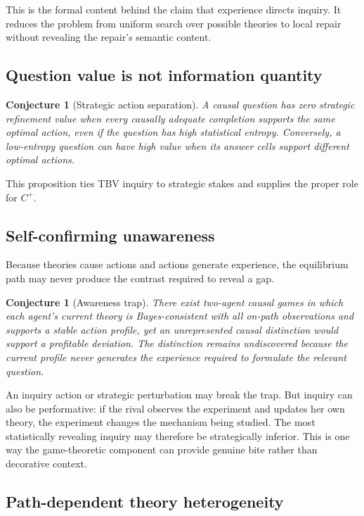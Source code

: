 \documentclass[11pt]{article}
\newtheorem{conjecture}[proposition]{Conjecture}
\newcommand{\cplus}{C^{+}}
\begin{document}
	This is the formal content behind the claim that experience directs inquiry.  It reduces the problem from uniform search over possible theories to local repair without revealing the repair's semantic content.
	
	\subsection{Question value is not information quantity}
	
	\begin{conjecture}[Strategic action separation]
		A causal question has zero strategic refinement value when every causally adequate completion supports the same optimal action, even if the question has high statistical entropy.  Conversely, a low-entropy question can have high value when its answer cells support different optimal actions.
	\end{conjecture}
	
	This proposition ties TBV inquiry to strategic stakes and supplies the proper role for $\cplus$.
	
	\subsection{Self-confirming unawareness}
	
	Because theories cause actions and actions generate experience, the equilibrium path may never produce the contrast required to reveal a gap.
	
	\begin{conjecture}[Awareness trap]
		There exist two-agent causal games in which each agent's current theory is Bayes-consistent with all on-path observations and supports a stable action profile, yet an unrepresented causal distinction would support a profitable deviation.  The distinction remains undiscovered because the current profile never generates the experience required to formulate the relevant question.
	\end{conjecture}
	
	An inquiry action or strategic perturbation may break the trap.  But inquiry can also be performative: if the rival observes the experiment and updates her own theory, the experiment changes the mechanism being studied.  The most statistically revealing inquiry may therefore be strategically inferior.  This is one way the game-theoretic component can provide genuine bite rather than decorative context.
	
	\subsection{Path-dependent theory heterogeneity}
	
\end{document}
